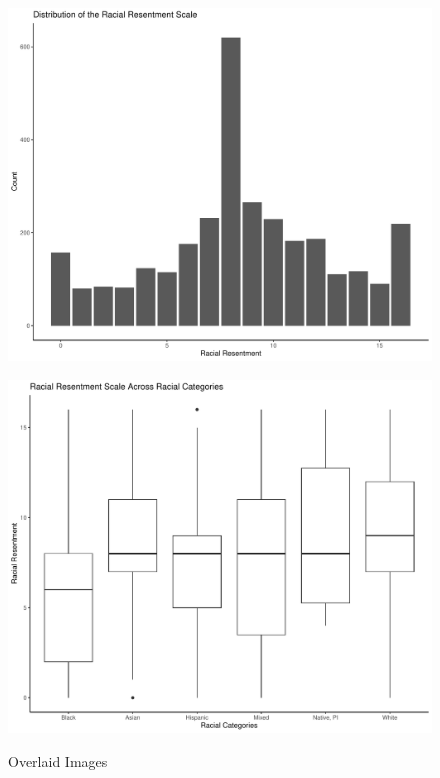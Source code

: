 \documentclass{article}
\begin{document}
\begin{figure}[htbp] %
\centering
\begin{minipage}{0.48\textwidth} %
    \centering
    \includegraphics[width=\textwidth]{figures/rr_barplot.pdf} %
            \label{fig:barplot}
\end{minipage}
\begin{minipage}{0.48\textwidth} %
    \centering
    \includegraphics[width=\textwidth]{figures/rr_race_boxplot.pdf} %
    \label{fig:boxplot}
\end{minipage}
\caption{Overlaid Images}
\label{fig:combined}
\end{figure}
\end{document}
